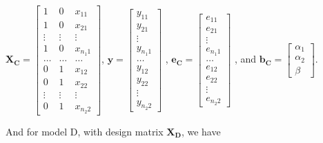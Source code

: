 \documentclass[11pt, oneside]{article}   	%
\begin{document}
\( \mathbf{X_C} =  \left[ \begin{array}{ccc}
1   &  0  &    x_{11}    \\
1   &  0   &   x_{21}    \\
\vdots &  \vdots  & \vdots   \\
1   &  0  &     x_{n_{1}1}   \\
\ldots  & \ldots  & \ldots    \\
0   &     1   & x_{12}  \\
0   &     1  & x_{22}   \\
\vdots   & \vdots  &  \vdots  \\
0   &     1   &    x_{n_{2}2}
\end{array} \right] \),
\( \mathbf{y} = \left[ \begin{array}{c}
y_{11} \\
y_{21} \\
\vdots  \\
y_{n_{1}1}  \\
\ldots \\
y_{12} \\
y_{22}  \\
\vdots  \\
y_{n_{2}2}
\end{array} \right] \) ,
\( \mathbf{e_{C}} = \left[ \begin{array}{c}
e_{11} \\
e_{21} \\
\vdots  \\
e_{n_{1}1}  \\
\ldots \\
e_{12} \\
e_{22}  \\
\vdots  \\
e_{n_{2}2}
\end{array} \right] \) ,
\mbox{and}
\( \mathbf{b_{C}} = \left[ \begin{array}{c}
\alpha_{1} \\
\alpha_{2}  \\
\beta
\end{array} \right] \).


 \bigskip

\noindent And for model D, with design matrix $ \mathbf{X_{D}} $, we have
\bigskip
\end{document}
